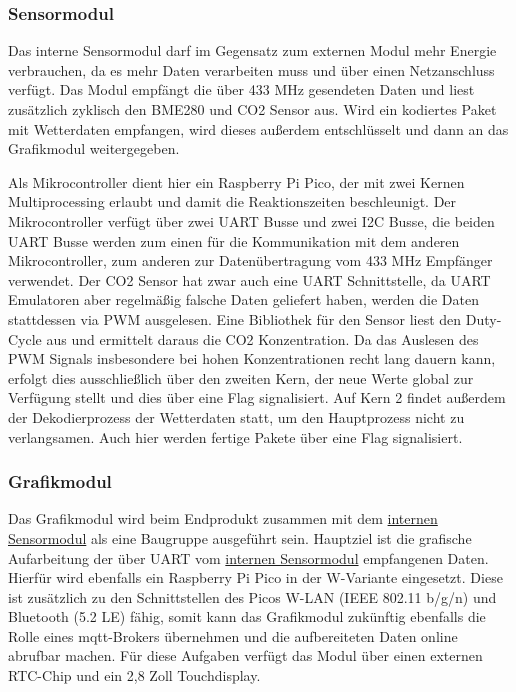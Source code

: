 \documentclass[a4paper,11pt]{article}
\begin{document}
\subsubsection{Sensormodul}
\label{subsubsub:sensormodulInt}

Das interne Sensormodul darf im Gegensatz zum externen Modul mehr Energie verbrauchen, da es mehr Daten verarbeiten muss und über einen Netzanschluss verfügt. 
Das Modul empfängt die über 433 MHz gesendeten Daten und liest zusätzlich zyklisch den BME280 und CO2 Sensor aus. Wird ein kodiertes Paket mit Wetterdaten empfangen, 
wird dieses außerdem entschlüsselt und dann an das Grafikmodul weitergegeben. 

\vspace{0.3cm}
\noindent
Als Mikrocontroller dient hier ein Raspberry Pi Pico, der mit zwei Kernen Multiprocessing erlaubt und damit die Reaktionszeiten beschleunigt. Der Mikrocontroller
verfügt über zwei UART Busse und zwei I2C Busse, die beiden UART Busse werden zum einen für die Kommunikation mit dem anderen Mikrocontroller, zum anderen zur Datenübertragung
vom 433 MHz Empfänger verwendet. Der CO2 Sensor hat zwar auch eine UART Schnittstelle, da UART Emulatoren aber regelmäßig falsche Daten geliefert haben, werden die Daten stattdessen
via PWM ausgelesen. Eine Bibliothek für den Sensor liest den Duty-Cycle aus und ermittelt daraus die CO2 Konzentration. Da das Auslesen des PWM Signals insbesondere bei hohen
Konzentrationen recht lang dauern kann, erfolgt dies ausschließlich über den zweiten Kern, der neue Werte global zur Verfügung stellt und dies über eine Flag signalisiert. 
Auf Kern 2 findet außerdem der Dekodierprozess der Wetterdaten statt, um den Hauptprozess nicht zu verlangsamen. Auch hier werden fertige Pakete über eine Flag signalisiert. 

\subsubsection{Grafikmodul}
\label{subsubsub:grafikmodulInt}

Das Grafikmodul wird beim Endprodukt zusammen mit dem \hyperref[subsub:sensormodulInt]{internen Sensormodul} als eine Baugruppe ausgeführt sein.
Hauptziel ist die grafische Aufarbeitung der über UART vom \hyperref[subsub:sensormodulInt]{internen Sensormodul} empfangenen Daten.
Hierfür wird ebenfalls ein Raspberry Pi Pico in der W-Variante eingesetzt.
Diese ist zusätzlich zu den Schnittstellen des Picos W-LAN (IEEE 802.11 b/g/n) und Bluetooth (5.2 LE) fähig, somit kann das Grafikmodul zukünftig ebenfalls die Rolle eines mqtt-Brokers übernehmen und die aufbereiteten Daten online abrufbar machen.
Für diese Aufgaben verfügt das Modul über einen externen RTC-Chip und ein 2,8 Zoll Touchdisplay.
\end{document}
